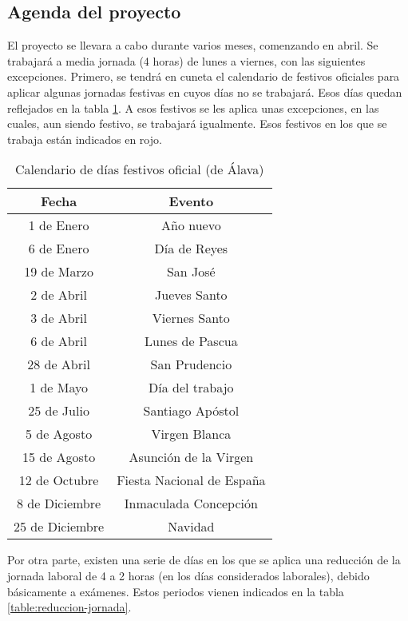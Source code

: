 \subsection{Agenda del proyecto}
El proyecto se llevara a cabo durante varios meses, comenzando en abril. Se trabajará a media jornada (4 horas) de lunes a viernes, con las siguientes excepciones. Primero, se tendrá en cuneta el calendario de festivos oficiales para aplicar algunas jornadas festivas en cuyos días no se trabajará. Esos días quedan reflejados en la tabla \ref{table:festivos-oficiales}. A esos festivos se les aplica unas excepciones, en las cuales, aun siendo festivo, se trabajará igualmente. Esos festivos en los que se trabaja están indicados en rojo.

\begin{table}[H]
	\centering
	\begin{tabular}{ |c|c| } 
		\hline
		Fecha & Evento \\
		\hline
		1 de Enero & Año nuevo \\
		6 de Enero & Día de Reyes \\
		19 de Marzo & San José \\
		{\color{red} 2 de Abril} & {\color{red} Jueves Santo }\\
		{\color{red} 3 de Abril} & {\color{red} Viernes Santo }\\
		{\color{red} 6 de Abril} & {\color{red} Lunes de Pascua }\\
		28 de Abril & San Prudencio \\
		1 de Mayo & Día del trabajo \\
		{\color{red}25 de Julio} & {\color{red}Santiago Apóstol } \\
		5 de Agosto & Virgen Blanca \\
		15 de Agosto & Asunción de la Virgen \\
		12 de Octubre & Fiesta Nacional de España \\
		8 de Diciembre & Inmaculada Concepción \\
		25 de Diciembre & Navidad \\
		\hline
	\end{tabular}
	\caption{Calendario de días festivos oficial (de Álava)}
	\label{table:festivos-oficiales}
\end{table}

Por otra parte, existen una serie de días en los que se aplica una reducción de la jornada laboral de 4 a 2 horas (en los días considerados laborales), debido básicamente a exámenes. Estos periodos vienen indicados en la tabla \ref{table:reduccion-jornada}.

